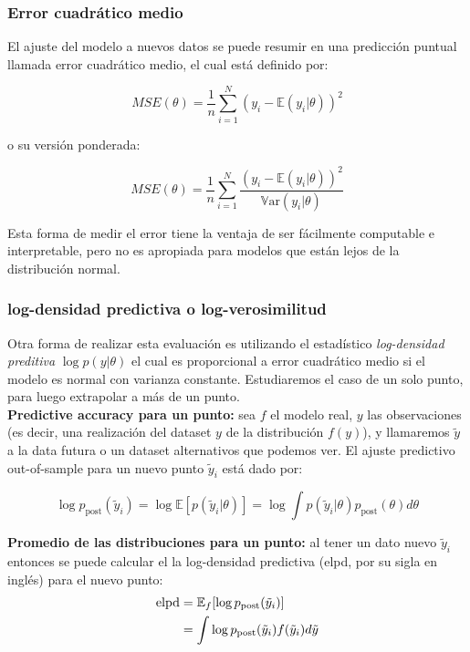 \subsubsection{Error cuadrático medio}

El ajuste del modelo a nuevos datos se puede resumir en una predicción puntual llamada error cuadrático medio, el cual está definido por:

\begin{equation}
MSE(\theta) = \frac{1}{n}\sum_{i=1}^N (y_i-\mathbb{E}(y_i|\theta))^2
\end{equation}

o su versión ponderada:

\begin{equation}
MSE(\theta) = \frac{1}{n}\sum_{i=1}^N \frac{(y_i-\mathbb{E}(y_i|\theta))^2}{\mathbb{V}\text{ar}(y_i|\theta)}
\end{equation}

Esta forma de medir el error tiene la ventaja de ser fácilmente computable e interpretable, pero no es apropiada para modelos que están lejos de la distribución normal.

\subsubsection{log-densidad predictiva o log-verosimilitud}
Otra forma de realizar esta evaluación es utilizando el estadístico \emph{log-densidad preditiva} $\log p(y|\theta)$ el cual es proporcional a error cuadrático medio si el modelo es normal con varianza constante. Estudiaremos el caso de un solo punto, para luego extrapolar a más de un punto.\\

\textbf{Predictive accuracy para un punto:} sea $f$ el modelo real, $y$ las observaciones (es decir, una realización del dataset $y$ de la distribución $f(y)$), y llamaremos $\tilde{y}$ a la data futura o un dataset alternativos que podemos ver. El ajuste predictivo out-of-sample para un nuevo punto $\tilde{y}_i$ está dado por:

\begin{equation}
\log p_{\text{post}}(\tilde{y}_i) = \log \mathbb{E}[p(\tilde{y}_i|\theta)] = \log \int p(\tilde{y}_i|\theta)p_{\text{post}}(\theta)d\theta
\end{equation}

\textbf{Promedio de las distribuciones para un punto:} al tener un dato nuevo $\tilde{y}_i$ entonces se puede calcular el la log-densidad predictiva (elpd, por su sigla en inglés) para el nuevo punto:
\begin{align}
\notag \text{elpd} & = \mathbb{E}_f[\log p_{\text{post}}(\tilde{y}_i)]\\
& = \int \log p_{\text{post}}(\tilde{y}_i) f(\tilde{y}_i)d\tilde{y}
\end{align}

